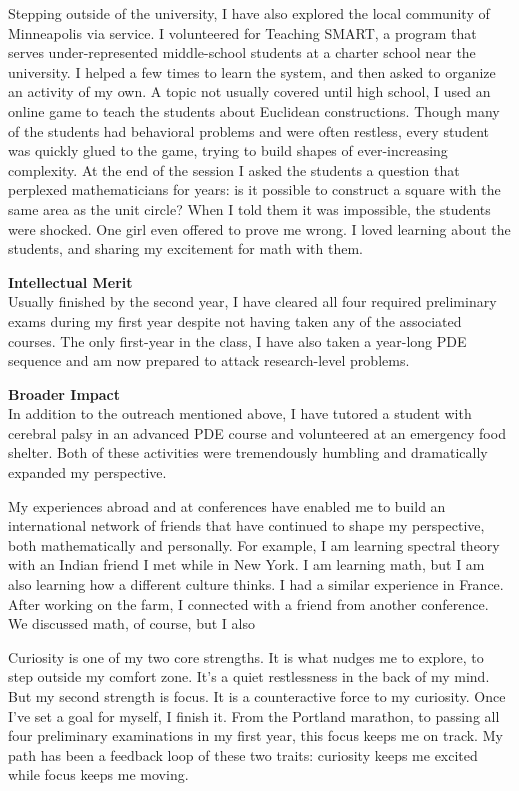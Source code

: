 \documentclass[12pt]{article}
\begin{document}
Stepping outside of the university, I have also explored the local community of Minneapolis via service. I volunteered for Teaching SMART, a program that serves under-represented middle-school students at a charter school near the university. I helped a few times to learn the system, and then asked to organize an activity of my own. A topic not usually covered until high school, I used an online game to teach the students about Euclidean constructions. Though many of the students had behavioral problems and were often restless, every student was quickly glued to the game, trying to build shapes of ever-increasing complexity. At the end of the session I asked the students a question that perplexed mathematicians for years: is it possible to construct a square with the same area as the unit circle? When I told them it was impossible, the students were shocked. One girl even offered to prove me wrong. I loved learning about the students, and sharing my excitement for math with them.


\textbf{Intellectual Merit}\\
Usually finished by the second year, I have cleared all four required preliminary exams during my first year despite not having taken any of the associated courses. The only first-year in the class, I have also taken a year-long PDE sequence and am now prepared to attack research-level problems. 



\textbf{Broader Impact}\\
In addition to the outreach mentioned above, I have tutored a student with cerebral palsy in an advanced PDE course and volunteered at an emergency food shelter. Both of these activities were tremendously humbling and dramatically expanded my perspective.

My experiences abroad and at conferences have enabled me to build an international network of friends that have continued to shape my perspective, both mathematically and personally. For example, I am learning spectral theory with an Indian friend I met while in New York. I am learning math, but I am also learning how a different culture thinks. I had a similar experience in France. After working on the farm, I connected with a friend from another conference. We discussed math, of course, but I also  

Curiosity is one of my two core strengths. It is what nudges me to explore, to step outside my comfort zone. It's a quiet restlessness in the back of my mind. But my second strength is focus. It is a counteractive force to my curiosity. Once I've set a goal for myself, I finish it. From the Portland marathon, to passing all four preliminary examinations in my first year, this focus keeps me on track. My path has been a feedback loop of these two traits: curiosity keeps me excited while focus keeps me moving. 
\end{document}
